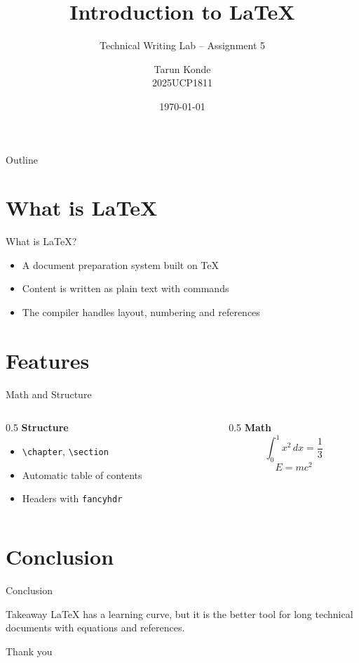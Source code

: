 \documentclass{beamer}
\title[Introduction to \LaTeX]{Introduction to \LaTeX}
\subtitle{Technical Writing Lab -- Assignment 5}
\author[Tarun Konde]{Tarun Konde \\ 2025UCP1811}
\institute[MNIT Jaipur]{Department of CSE, MNIT Jaipur}
\date{\today}
\begin{document}
\begin{frame}
    \titlepage
\end{frame}

\begin{frame}{Outline}
    \tableofcontents
\end{frame}

\section{What is \LaTeX}

\begin{frame}{What is \LaTeX?}
    \begin{itemize}
        \item<1-> A document preparation system built on \TeX
        \item<2-> Content is written as plain text with commands
        \item<3-> The compiler handles layout, numbering and references
    \end{itemize}

\end{frame}

\section{Features}

\begin{frame}{Math and Structure}
    \begin{columns}
        \begin{column}{0.5\textwidth}
            \textbf{Structure}
            \begin{itemize}
                \item \texttt{\textbackslash chapter}, \texttt{\textbackslash section}
                \item Automatic table of contents
                \item Headers with \texttt{fancyhdr}
            \end{itemize}
        \end{column}
        \begin{column}{0.5\textwidth}
            \textbf{Math}
            \[
                \int_0^1 x^2\,dx = \frac{1}{3}
            \]
            \[
                E = mc^2
            \]
        \end{column}
    \end{columns}
\end{frame}

\section{Conclusion}

\begin{frame}{Conclusion}
    \begin{alertblock}{Takeaway}
        \LaTeX{} has a learning curve, but it is the better tool for long
        technical documents with equations and references.
    \end{alertblock}

    \vspace{0.5cm}
    \centering
    Thank you
\end{frame}
\end{document}
